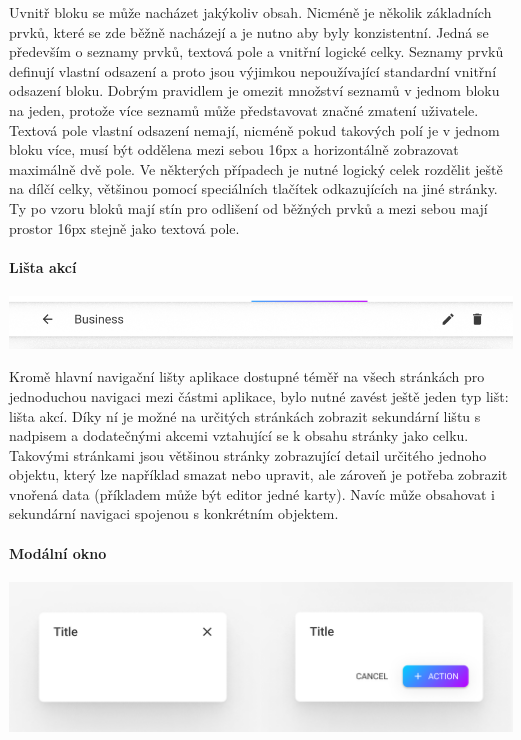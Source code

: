 \begin{itemize}
\begin{itemize}
			Uvnitř bloku se může nacházet jakýkoliv obsah.
			Nicméně je několik základních prvků, které se zde běžně nacházejí a je nutno aby byly konzistentní.
			Jedná se především o seznamy prvků, textová pole a vnitřní logické celky.
			Seznamy prvků definují vlastní odsazení a proto jsou výjimkou nepoužívající standardní vnitřní odsazení
			bloku.
			Dobrým pravidlem je omezit množství seznamů v jednom bloku na jeden, protože více seznamů může představovat
			značné zmatení uživatele.
			Textová pole vlastní odsazení nemají, nicméně pokud takových polí je v jednom bloku více, musí být oddělena
			mezi sebou 16px a horizontálně zobrazovat maximálně dvě pole.
			Ve některých případech je nutné logický celek rozdělit ještě na dílčí celky, většinou pomocí speciálních
			tlačítek odkazujících na jiné stránky.
			Ty po vzoru bloků mají stín pro odlišení od běžných prvků a mezi sebou mají prostor 16px stejně jako
			textová pole.

			\paragraph{Lišta akcí}

			\includegraphics[width=0.24\linewidth]{obrazky/lista_akci.png}\hfill

			Kromě hlavní navigační lišty aplikace dostupné téměř na všech stránkách pro jednoduchou navigaci mezi
			částmi aplikace, bylo nutné zavést ještě jeden typ lišt: lišta akcí.
			Díky ní je možné na určitých stránkách zobrazit sekundární lištu s nadpisem a dodatečnými akcemi vztahující
			se k obsahu stránky jako celku.
			Takovými stránkami jsou většinou stránky zobrazující detail určitého jednoho objektu, který lze například
			smazat nebo upravit, ale zároveň je potřeba zobrazit vnořená data (příkladem může být editor jedné karty).
			Navíc může obsahovat i sekundární navigaci spojenou s konkrétním objektem.

			\paragraph{Modální okno}

			\includegraphics[width=0.24\linewidth]{obrazky/modalni_okno.png}\hfill


\end{itemize}
\end{itemize}
